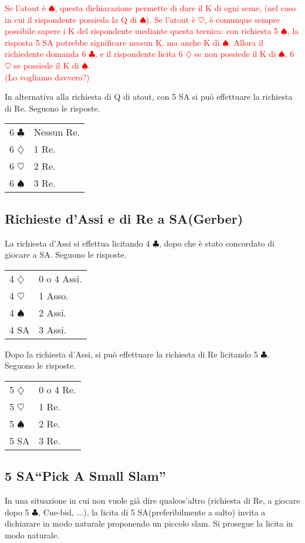 \documentclass[a4paper,10pt]{article}
\renewcommand{\c}{$\clubsuit$\xspace}
\renewcommand{\d}{$\diamondsuit$\xspace}
\newcommand{\h}{$\heartsuit$\xspace}
\newcommand{\s}{$\spadesuit$\xspace}
\newcommand{\sa}{SA\xspace}
\newcommand{\smallspace}{\vskip0.3cm}
\newcommand{\note}[1]{\textcolor{red}{#1}}
\newenvironment{twocol}
  {\smallspace\noindent\begin{tabular}{l p{0.78\textwidth}}}
  {\end{tabular}\smallspace}
\begin{document}
\note{Se l'atout è \s, questa dichiarazione permette di dare il K di ogni seme, (nel caso in cui il rispondente possieda la Q di \s). Se l'atout è \h, è comunque sempre possibile sapere i K del rispondente mediante questa tecnica: con richiesta 5 \s, la risposta 5 \sa potrebbe significare nessun K, ma anche K di \s.
Allora il richiedente domanda 6 \c, e il rispondente licita 6 \d se non possiede il K di \s, 6 \h se possiede il K di \s.\\
(Lo vogliamo davvero?)}


\smallspace

\noindent In alternativa alla richiesta di Q di atout, con 5 \sa si può effettuare la richiesta di Re. Seguono le risposte.

\begin{twocol}
6 \c & Nessun Re.\\
6 \d & 1 Re.\\
6 \h & 2 Re.\\
6 \s & 3 Re. \\
\end{twocol}


\subsection{Richieste d'Assi e di Re a \sa (Gerber)}

La richiesta d'Assi si effettua licitando 4 \c, dopo che è stato concordato di giocare a \sa. Seguono le risposte.
\begin{twocol}
  4 \d & 0 o 4 Assi.\\
  4 \h & 1 Asso.\\
  4 \s & 2 Assi.\\
  4 \sa & 3 Assi.
\end{twocol}

\noindent Dopo la richiesta d'Assi, si può effettuare la richiesta di Re licitando 5 \c. Seguono le risposte.
\begin{twocol}
  5 \d & 0 o 4 Re.\\
  5 \h & 1 Re.\\
  5 \s & 2 Re.\\
  5 \sa & 3 Re.
\end{twocol}


\subsection{5 \sa ``Pick A Small Slam''}

In una situazione in cui non vuole già dire qualcos'altro (richiesta di Re, a giocare dopo 5 \c, Cue-bid, ...), la licita di 5 \sa (preferibilmente a salto) invita a dichiarare in modo naturale proponendo un piccolo slam. Si prosegue la licita in modo naturale.
\end{document}
